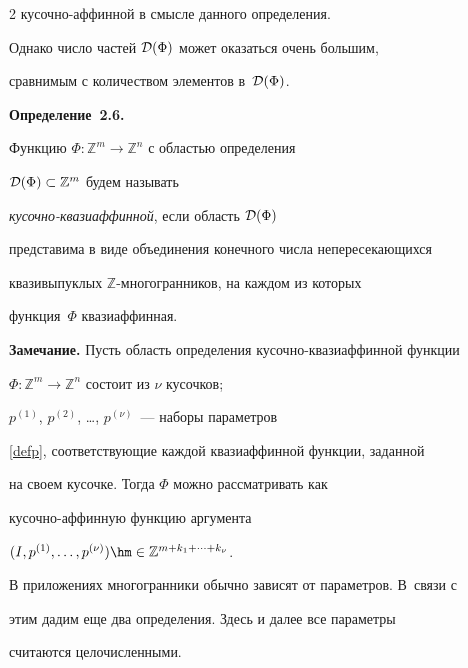 \begin{multicols}{2}
ку\-соч\-но-аф\-фин\-ной в смысле данного определения.

Однако число частей ${\cal D}(\Phi)$ может оказаться очень большим,

сравнимым с количеством элементов в~${\cal D}(\Phi)$.



\smallskip



\noindent

\textbf{Определение~2.6.}

Функцию $\Phi:\mathbb{Z}^m\to\mathbb{Z}^n$ с областью определения

${\cal D}(\Phi)\subset\mathbb{Z}^m$ будем называть

\textit{кусочно-ква\-зи\-аф\-фин\-ной}, если область ${\cal D}(\Phi)$

представима в виде объединения конечного числа не\-пе\-ре\-се\-ка\-ющих\-ся

квазивыпуклых $\mathbb{Z}$-мно\-го\-гран\-ников, на каж\-дом из которых

функция~$\Phi$ квазиаффинная.



\smallskip



\noindent

\textbf{Замечание.} Пусть область определения ку\-соч\-но-ква\-зи\-аф\-фин\-ной функции

$\Phi:\mathbb{Z}^m\to\mathbb{Z}^n$ состоит из $\nu$ кусочков;

$p^{(1)}$, $p^{(2)}$, \dots, $p^{(\nu)}$~--- наборы па\-ра\-мет\-ров

\eqref{defp}, соответствующие каждой квазиаффинной функции, заданной

на своем кусочке. Тогда $\Phi$ можно рассматривать как

ку\-соч\-но-аф\-фин\-ную функцию аргумента

$(I,p^{(1)},\ldots,p^{(\nu)})\hm\in\mathbb{Z}^{m+k_1+\cdots+k_\nu}$.



В приложениях многогранники обычно зависят от параметров. В~связи с

этим дадим еще два определения. Здесь и далее все па\-ра\-мет\-ры

считаются целочисленными.



\smallskip



\noindent


\end{multicols}
